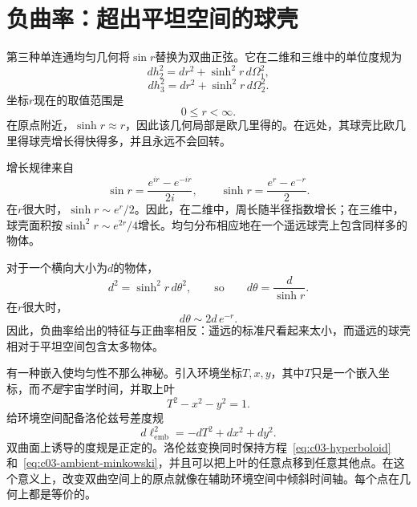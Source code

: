 \section{负曲率：超出平坦空间的球壳}

第三种单连通均匀几何将\(\sin r\)替换为双曲正弦。它在二维和三维中的单位度规为
\begin{equation}
dh_2^2 = dr^2 + \sinh^2 r\, d\Omega_1^2,
\label{eq:c03-hyperbolic-two}
\end{equation}
\begin{equation}
dh_3^2 = dr^2 + \sinh^2 r\, d\Omega_2^2.
\label{eq:c03-hyperbolic-three}
\end{equation}
坐标\(r\)现在的取值范围是
\begin{equation}
0\le r<\infty.
\end{equation}
在原点附近，\(\sinh r\approx r\)，因此该几何局部是欧几里得的。在远处，其球壳比欧几里得球壳增长得快得多，并且永远不会回转。

增长规律来自
\begin{equation}
\sin r = \frac{e^{ir}-e^{-ir}}{2i},
\qquad
\sinh r = \frac{e^r-e^{-r}}{2}.
\label{eq:c03-sin-sinh}
\end{equation}
在\(r\)很大时，\(\sinh r\sim e^r/2\)。因此，在二维中，周长随半径指数增长；在三维中，球壳面积按\(\sinh^2r\sim e^{2r}/4\)增长。均匀分布相应地在一个遥远球壳上包含同样多的物体。

对于一个横向大小为\(d\)的物体，
\begin{equation}
d^2 = \sinh^2 r\, d\theta^2,
\qquad\text{so}\qquad
d\theta = \frac{d}{\sinh r}.
\label{eq:c03-hyperbolic-angle}
\end{equation}
在\(r\)很大时，
\begin{equation}
d\theta \sim 2d\,e^{-r}.
\end{equation}
因此，负曲率给出的特征与正曲率相反：遥远的标准尺看起来太小，而遥远的球壳相对于平坦空间包含太多物体。

\begin{classroomqa}
\end{classroomqa}

有一种嵌入使均匀性不那么神秘。引入环境坐标\(T,x,y\)，其中\(T\)只是一个嵌入坐标，而\emph{不是}宇宙学时间，并取上叶
\begin{equation}
T^2 - x^2 - y^2 = 1.
\label{eq:c03-hyperboloid}
\end{equation}
给环境空间配备洛伦兹号差度规
\begin{equation}
d\ell_{\mathrm{emb}}^2=-dT^2+dx^2+dy^2.
\label{eq:c03-ambient-minkowski}
\end{equation}
双曲面上诱导的度规是正定的。洛伦兹变换同时保持方程~\eqref{eq:c03-hyperboloid}和~\eqref{eq:c03-ambient-minkowski}，并且可以把上叶的任意点移到任意其他点。在这个意义上，改变双曲空间上的原点就像在辅助环境空间中倾斜时间轴。每个点在几何上都是等价的。


